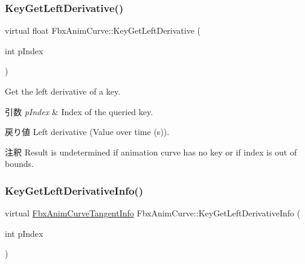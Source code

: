 \subsubsection{\texorpdfstring{Key\+Get\+Left\+Derivative()}{KeyGetLeftDerivative()}}
{\footnotesize\ttfamily virtual float Fbx\+Anim\+Curve\+::\+Key\+Get\+Left\+Derivative (\begin{DoxyParamCaption}\item[{int}]{p\+Index }\end{DoxyParamCaption})\hspace{0.3cm}{\ttfamily [pure virtual]}}

Get the left derivative of a key. 
\begin{DoxyParams}{引数}
{\em p\+Index} & Index of the queried key. \\
\hline
\end{DoxyParams}
\begin{DoxyReturn}{戻り値}
Left derivative (Value over time (s)). 
\end{DoxyReturn}
\begin{DoxyRemark}{注釈}
Result is undetermined if animation curve has no key or if index is out of bounds. 
\end{DoxyRemark}
\mbox{\label{class_fbx_anim_curve_a28398566658955d12824942635ee45ab}} 
\subsubsection{\texorpdfstring{Key\+Get\+Left\+Derivative\+Info()}{KeyGetLeftDerivativeInfo()}}
{\footnotesize\ttfamily virtual \hyperlink{struct_fbx_anim_curve_tangent_info}{Fbx\+Anim\+Curve\+Tangent\+Info} Fbx\+Anim\+Curve\+::\+Key\+Get\+Left\+Derivative\+Info (\begin{DoxyParamCaption}\item[{int}]{p\+Index }\end{DoxyParamCaption})\hspace{0.3cm}{\ttfamily [pure virtual]}}

